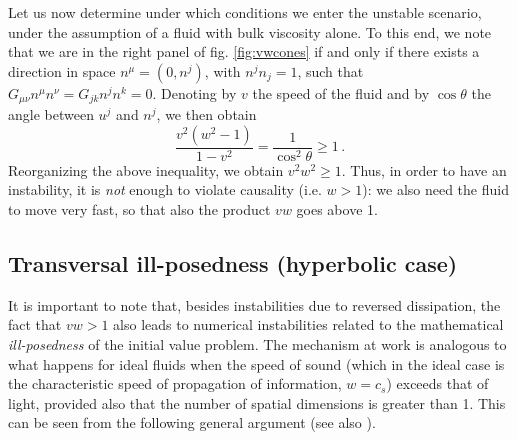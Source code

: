 \documentclass[aps, prd, showkeys,superscriptaddress, nofootinbib,floatfix]{revtex4-2}
\begin{document}
Let us now determine under which conditions we enter the unstable scenario, under the assumption of a fluid with bulk viscosity alone. To this end, we note that we are in the right panel of fig. \ref{fig:vwcones} if and only if there exists a direction in space $n^\mu=(0,n^j)$, with $n^j n_j=1$, such that $G_{\mu \nu}n^\mu n^\nu=G_{jk}n^j n^k=0$. Denoting by $v$ the speed of the fluid and by $\cos\theta$ the angle between $u^j$ and $n^j$, we then obtain
\begin{equation}
\dfrac{v^2(w^2-1)}{1-v^2} =\dfrac{1}{\cos^2 \theta} \geq 1 \, .
\end{equation}
Reorganizing the above inequality, we obtain $v^2w^2\geq 1$. Thus, in order to have an instability, it is \emph{not} enough to violate causality (i.e. $w>1$): we also need the fluid to move very fast, so that also the product $v w$ goes above 1.




\subsection{Transversal ill-posedness (hyperbolic case)}\label{hy2}

It is important to note that, besides instabilities due to reversed dissipation, the fact that $vw> 1$  also leads to numerical instabilities related to the mathematical \textit{ill-posedness} of the initial value problem. The mechanism at work is analogous to what happens for ideal fluids when the speed of sound (which in the ideal case is the characteristic speed of propagation of information, $w = c_{s}$) exceeds that of light, provided also that the number of spatial dimensions is greater than 1. This can be seen from the following general argument (see also \cite{Adams:2006sv,Babichev:2007dw}).
\end{document}

